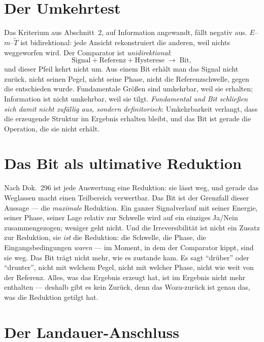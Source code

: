 \section{Der Umkehrtest}

Das Kriterium aus Abschnitt~2, auf Information angewandt, fällt negativ aus.
$E$--$m$--$\tilde{T}$ ist bidirektional: jede Ansicht rekonstruiert die
anderen, weil nichts weggeworfen wird. Der Comparator ist \emph{unidirektional}:
\begin{equation}
  \text{Signal} + \text{Referenz} + \text{Hysterese}
  \;\longrightarrow\; \text{Bit},
\end{equation}
und dieser Pfeil kehrt nicht um. Aus einem Bit erhält man das Signal nicht
zurück, nicht seinen Pegel, nicht seine Phase, nicht die Referenzschwelle, gegen
die entschieden wurde. Fundamentale Größen sind umkehrbar, weil sie erhalten;
Information ist nicht umkehrbar, weil sie tilgt. \emph{Fundamental und Bit
schließen sich damit nicht zufällig aus, sondern definitorisch}: Umkehrbarkeit
verlangt, dass die erzeugende Struktur im Ergebnis erhalten bleibt, und das Bit
ist gerade die Operation, die sie nicht erhält.

\section{Das Bit als ultimative Reduktion}

Nach Dok.~296 ist jede Auswertung eine Reduktion: sie lässt weg, und gerade das
Weglassen macht einen Teilbereich verwertbar. Das Bit ist der Grenzfall dieser
Aussage --- die \emph{maximale} Reduktion. Ein ganzer Signalverlauf mit seiner
Energie, seiner Phase, seiner Lage relativ zur Schwelle wird auf ein einziges
Ja/Nein zusammengezogen; weniger geht nicht. Und die Irreversibilität ist nicht
ein Zusatz zur Reduktion, sie \emph{ist} die Reduktion: die Schwelle, die Phase,
die Eingangsbedingungen \emph{waren} --- im Moment, in dem der Comparator kippt,
sind sie weg. Das Bit trägt nicht mehr, wie es zustande kam. Es sagt
\enquote{drüber} oder \enquote{drunter}, nicht mit welchem Pegel, nicht mit
welcher Phase, nicht wie weit von der Referenz. Alles, was das Ergebnis erzeugt
hat, ist im Ergebnis nicht mehr enthalten --- deshalb gibt es kein Zurück, denn
das Wozu-zurück ist genau das, was die Reduktion getilgt hat.

\section{Der Landauer-Anschluss}

